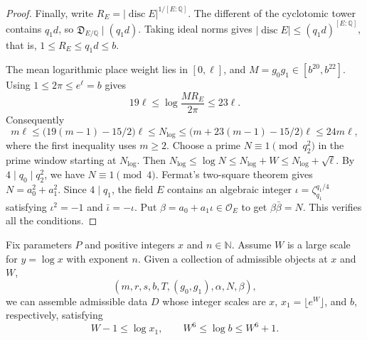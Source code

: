 \begin{proof}
Finally, write $R_E=|\operatorname{disc}E|^{1/[E:\mathbb Q]}$. The different of the cyclotomic tower contains $q_1d$, so
$\mathfrak D_{E/\mathbb Q}\mid(q_1d)$. Taking ideal norms gives $|\operatorname{disc}E|\le(q_1d)^{[E:\mathbb Q]}$, that is, $1\le R_E\le q_1d\le b$.

The mean logarithmic place weight lies in $[0,\ell]$, and $M=g_0g_1\in[b^{20},b^{22}]$. Using $1\le2\pi\le e^\ell=b$ gives
\[
 19\ell\le\log\frac{MR_E}{2\pi}\le23\ell .
\]
Consequently
\[
 m\ell\le \bigl(19(m-1)-15/2\bigr)\ell
 \le N_{\log}
 \le \bigl(m+23(m-1)-15/2\bigr)\ell\le24m\ell ,
\]
where the first inequality uses $m\ge2$. Choose a prime $N\equiv1\pmod{q_2^2}$ in the prime window starting at $N_{\log}$. Then
$N_{\log}\le\log N\le N_{\log}+W\le N_{\log}+\sqrt \ell$.
By $4\mid q_0\mid q_2^2$, we have $N\equiv1\pmod4$. Fermat's two-square theorem gives
$N=a_0^2+a_1^2$. Since $4\mid q_1$, the field $E$ contains an algebraic integer $\iota=\zeta_{q_1}^{q_1/4}$ satisfying $\iota^2=-1$ and $\bar\iota=-\iota$. Put $\beta=a_0+a_1\iota\in\mathcal O_E$ to get $\beta\bar\beta=N$. This verifies all the conditions.
\end{proof}

\begin{lemma}
\label{lem:admissible-fields}
\emitthmsource
Fix parameters $P$ and positive integers $x$ and $n\in\mathbb N$. Assume $W$ is a large scale for $y=\log x$ with exponent $n$. Given a collection of admissible objects at $x$ and $W$,
\[
 (m,r,s,b,T,(g_0,g_1),\alpha,N,\beta),
\]
we can assemble admissible data $D$ whose integer scales are $x$, $x_1=\lfloor e^W\rfloor$, and $b$, respectively, satisfying
\[
 W-1\le\log x_1,\qquad W^6\le\log b\le W^6+1 .
\]
\end{lemma}

